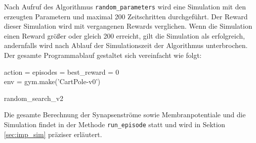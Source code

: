 		Nach Aufruf des Algorithmus \texttt{random\_parameters} wird eine Simulation mit den erzeugten Parametern und maximal 200 Zeitschritten durchgeführt. Der Reward dieser Simulation wird mit vergangenen Rewards verglichen. Wenn die Simulation einen Reward größer oder gleich 200 erreicht, gilt die Simulation als erfolgreich, andernfalls wird nach Ablauf der Simulationszeit der Algorithmus unterbrochen.\\
		Der gesamte Programmablauf gestaltet sich vereinfacht wie folgt:
		\begin{algorithm}
			
			
			action = episodes = best\_reward = 0\\
			env = gym.make('CartPole-v0')\\
			\caption{random\_search\_v2}
		\end{algorithm}
		Die gesamte Berechnung der Synapsenströme sowie Membranpotentiale und die Simulation findet in der Methode \texttt{run\_episode} statt und wird in Sektion \ref{sec:imp_sim} präziser erläutert.
